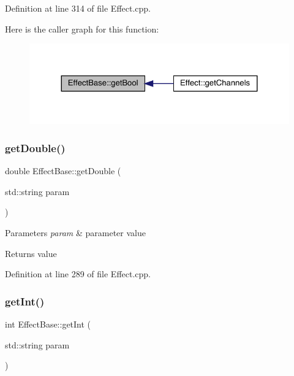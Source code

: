 Definition at line 314 of file Effect.\+cpp.

Here is the caller graph for this function\+:
\nopagebreak
\begin{figure}[H]
\begin{center}
\leavevmode
\includegraphics[width=324pt]{class_effect_base_a5ce32d92ebf6973d177d0f8d1be8e8ba_icgraph}
\end{center}
\end{figure}
\mbox{\label{class_effect_base_a29ac04c6135b4a202c0fab169f97f436}} 
\subsubsection{\texorpdfstring{get\+Double()}{getDouble()}}
{\footnotesize\ttfamily double Effect\+Base\+::get\+Double (\begin{DoxyParamCaption}\item[{std\+::string}]{param }\end{DoxyParamCaption})\hspace{0.3cm}{\ttfamily [static]}}


\begin{DoxyParams}{Parameters}
{\em param} & parameter value \\
\hline
\end{DoxyParams}
\begin{DoxyReturn}{Returns}
value 
\end{DoxyReturn}


Definition at line 289 of file Effect.\+cpp.

\mbox{\label{class_effect_base_aa2c8a7dfd4511cbb41f5ca1afd14cbb5}} 
\subsubsection{\texorpdfstring{get\+Int()}{getInt()}}
{\footnotesize\ttfamily int Effect\+Base\+::get\+Int (\begin{DoxyParamCaption}\item[{std\+::string}]{param }\end{DoxyParamCaption})\hspace{0.3cm}{\ttfamily [static]}}



